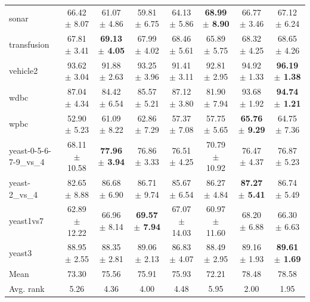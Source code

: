 \begin{table}[t]
\begin{tabular}{lccccccc}
sonar & 66.42 $\pm$ 8.07 & 61.07 $\pm$ 4.86 & 59.81 $\pm$ 6.75 & 64.13 $\pm$ 5.86 & \textbf{68.99 $\pm$ 8.90} & 66.77 $\pm$ 3.46 & 67.12 $\pm$ 6.24 \\
transfusion & 67.81 $\pm$ 3.41 & \textbf{69.13 $\pm$ 4.05} & 67.99 $\pm$ 4.02 & 68.46 $\pm$ 5.61 & 65.89 $\pm$ 5.75 & 68.32 $\pm$ 4.25 & 68.65 $\pm$ 4.26 \\
vehicle2 & 93.62 $\pm$ 3.04 & 91.88 $\pm$ 2.63 & 93.25 $\pm$ 3.96 & 91.41 $\pm$ 3.11 & 92.81 $\pm$ 2.95 & 94.92 $\pm$ 1.33 & \textbf{96.19 $\pm$ 1.38} \\
wdbc & 87.04 $\pm$ 4.34 & 84.42 $\pm$ 6.54 & 85.57 $\pm$ 5.21 & 87.12 $\pm$ 3.80 & 81.90 $\pm$ 7.94 & 93.68 $\pm$ 1.92 & \textbf{94.74 $\pm$ 1.21} \\
wpbc & 52.90 $\pm$ 5.23 & 61.09 $\pm$ 8.22 & 62.86 $\pm$ 7.29 & 57.37 $\pm$ 7.08 & 57.75 $\pm$ 5.65 & \textbf{65.76 $\pm$ 9.29} & 64.75 $\pm$ 7.36 \\
yeast-0-5-6-7-9\_vs\_4 & 68.11 $\pm$ 10.58 & \textbf{77.96 $\pm$ 3.94} & 76.86 $\pm$ 3.33 & 76.51 $\pm$ 4.25 & 70.79 $\pm$ 10.92 & 76.47 $\pm$ 4.37 & 76.87 $\pm$ 5.23 \\
yeast-2\_vs\_4 & 82.65 $\pm$ 8.88 & 86.68 $\pm$ 6.90 & 86.71 $\pm$ 9.74 & 85.67 $\pm$ 6.54 & 86.27 $\pm$ 4.84 & \textbf{87.27 $\pm$ 5.41} & 86.74 $\pm$ 5.49 \\
yeast1vs7 & 62.89 $\pm$ 12.22 & 66.96 $\pm$ 8.14 & \textbf{69.57 $\pm$ 7.94} & 67.07 $\pm$ 14.03 & 60.97 $\pm$ 11.60 & 68.20 $\pm$ 6.88 & 66.30 $\pm$ 6.63 \\
yeast3 & 88.95 $\pm$ 2.55 & 88.35 $\pm$ 2.81 & 89.06 $\pm$ 2.13 & 86.83 $\pm$ 4.07 & 88.49 $\pm$ 2.95 & 89.16 $\pm$ 1.93 & \textbf{89.61 $\pm$ 1.69} \\
\midrule
Mean & 73.30 & 75.56 & 75.91 & 75.93 & 72.21 & 78.48 & 78.58 \\
Avg. rank & 5.26 & 4.36 & 4.00 & 4.48 & 5.95 & 2.00 & 1.95 \\
\bottomrule
\end{tabular}
\end{table}